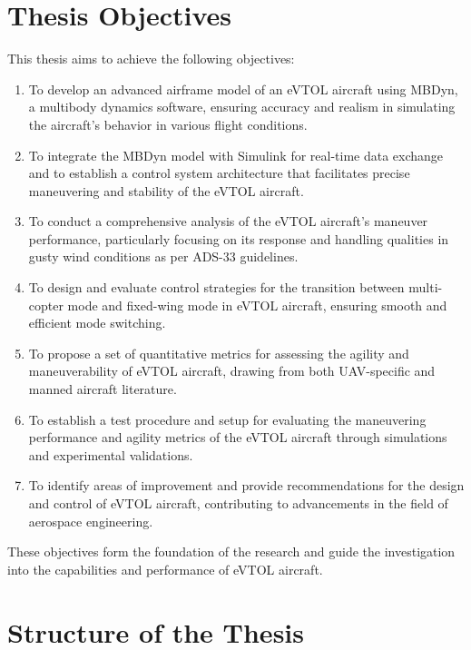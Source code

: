 \documentclass{Configuration_Files/PoliMi3i_thesis}
\begin{document}
\section*{Thesis Objectives}

This thesis aims to achieve the following objectives:

\begin{enumerate}
    \item To develop an advanced airframe model of an eVTOL aircraft using MBDyn, a multibody dynamics software, ensuring accuracy and realism in simulating the aircraft's behavior in various flight conditions.

    \item To integrate the MBDyn model with Simulink for real-time data exchange and to establish a control system architecture that facilitates precise maneuvering and stability of the eVTOL aircraft.

    \item To conduct a comprehensive analysis of the eVTOL aircraft's maneuver performance, particularly focusing on its response and handling qualities in gusty wind conditions as per ADS-33 guidelines.

    \item To design and evaluate control strategies for the transition between multi-copter mode and fixed-wing mode in eVTOL aircraft, ensuring smooth and efficient mode switching.

    \item To propose a set of quantitative metrics for assessing the agility and maneuverability of eVTOL aircraft, drawing from both UAV-specific and manned aircraft literature.

    \item To establish a test procedure and setup for evaluating the maneuvering performance and agility metrics of the eVTOL aircraft through simulations and experimental validations.

    \item To identify areas of improvement and provide recommendations for the design and control of eVTOL aircraft, contributing to advancements in the field of aerospace engineering.
\end{enumerate}

These objectives form the foundation of the research and guide the investigation into the capabilities and performance of eVTOL aircraft.

\section*{Structure of the Thesis}
\end{document}
